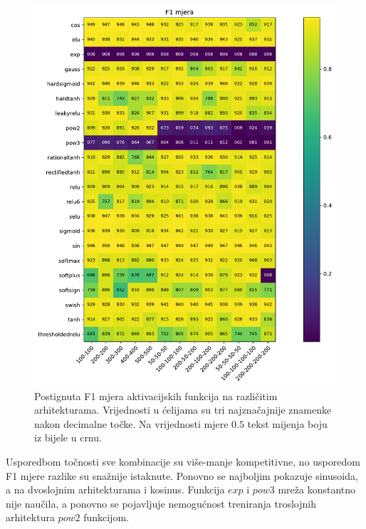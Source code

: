 \documentclass[times, utf8, numeric, diplomski]{fer}
\begin{document}
\begin{figure}[H]
\includegraphics[width=\textwidth]{greedy_9_f1.pdf}
\centering
\caption{Postignuta F1 mjera aktivacijskih funkcija na različitim arhitekturama. Vrijednosti u ćelijama su tri najznačajnije znamenke nakon decimalne točke. Na vrijednosti mjere $0.5$ tekst mijenja boju iz bijele u crnu.}
\label{fig:greedy_9_f1}
\end{figure}

Usporedbom točnosti sve kombinacije su više-manje kompetitivne, no usporedom F1 mjere razlike su snažnije istaknute. Ponovno se najboljim pokazuje sinusoida, a na dvoslojnim arhitekturama i kosinus. Funkcija $exp$ i $pow3$ mreža konstantno nije naučila, a ponovno se pojavljuje nemogućnost treniranja troslojnih arhitektura $pow2$ funkcijom.
\end{document}
